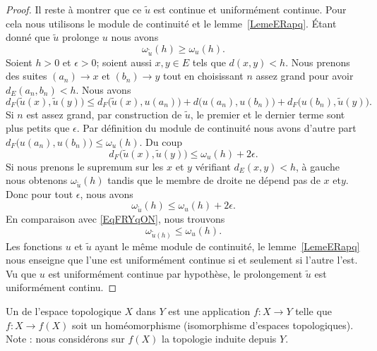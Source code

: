 \begin{proof}
	Il reste à montrer que ce \( \tilde u\) est continue et uniformément continue. Pour cela nous utilisons le module de continuité et le lemme~\ref{LemeERapq}. Étant donné que \( \tilde u\) prolonge \( u\) nous avons
	\begin{equation}        \label{EqFRYqON}
		\omega_{\tilde u}(h)\geq \omega_u(h).
	\end{equation}
	Soient \( h>0\) et \( \epsilon>0\); soient aussi \( x,y\in E\) tels que \( d(x,y)<h\). Nous prenons des suites \( (a_n)\to x\) et \( (b_n)\to y\) tout en choisissant \( n\) assez grand pour avoir \( d_E(a_n,b_n)<h\). Nous avons
	\begin{equation}
		d_F\big( \tilde u(x),\tilde u(y) \big)\leq d_F\big( \tilde u(x),u(a_n) \big)+d\big( u(a_n),u(b_n) \big)+d_F\big( u(b_n),\tilde u(y) \big).
	\end{equation}
	Si \( n\) est assez grand, par construction de \( \tilde u\), le premier et le dernier terme sont plus petits que \( \epsilon\). Par définition du module de continuité nous avons d'autre part \( d_F\big( u(a_n),u(b_n) \big)\leq \omega_u(h)\). Du coup
	\begin{equation}
		d_F\big( \tilde u(x),\tilde u(y) \big)\leq \omega_u(h)+2\epsilon.
	\end{equation}
	Si nous prenons le supremum sur les \( x\) et \( y\) vérifiant \( d_E(x,y)<h\), à gauche nous obtenons \( \omega_{\tilde u}(h)\) tandis que le membre de droite ne dépend pas de \( x\) et\( y\). Donc pour tout \( \epsilon\), nous avons
	\begin{equation}
		\omega_{\tilde u}(h)\leq \omega_u(h)+2\epsilon.
	\end{equation}
	En comparaison avec \eqref{EqFRYqON}, nous trouvons
	\begin{equation}
		\omega_{\tilde u(h)}\leq \omega_u(h).
	\end{equation}
	Les fonctions \( u\) et \( \tilde u\) ayant le même module de continuité, le lemme~\ref{LemeERapq} nous enseigne que l'une est uniformément continue si et seulement si l'autre l'est. Vu que \( u\) est uniformément continue par hypothèse, le prolongement \( \tilde u\) est uniformément continu.
\end{proof}

\begin{definition}      \label{DEFooMHQMooEvLccV}
	Un  de l'espace topologique \( X\) dans \( Y\) est une application \( f\colon X\to Y\) telle que \( f\colon X\to f(X)\) soit un homéomorphisme (isomorphisme d'espaces topologiques). Note : nous considérons sur \( f(X)\) la topologie induite depuis \( Y\).
\end{definition}

